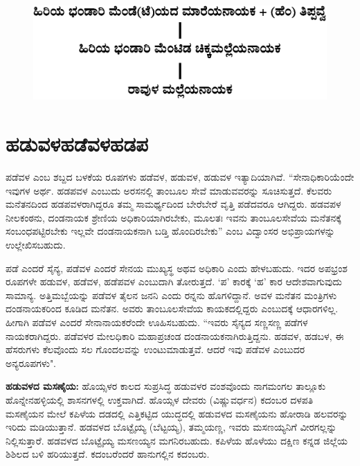 \begin{figure}[H]
\includegraphics[scale=1.2]{images/chap3/chap3fig31.jpeg}
\end{figure}


\section*{ಹಡುವಳ\enginline{-}ಹಡೆವಳ\enginline{-}ಹಡಪ}

ಪಡೆವಳ ಎಂಬ ಶಬ್ದದ ಬಳಕೆಯ ರೂಪಗಳು ಹಡೆವಳ, ಹಡುವಳ, ಹಡುವಳ ಇತ್ಯಾದಿಯಾಗಿವೆ. “ಸೇನಾಧಿಕಾರಿಯೆಂದೇ ಇವುಗಳ ಅರ್ಥ. ಹಡಪವಳ ಎಂಬುದು ಅರಸನಲ್ಲಿ ತಾಂಬೂಲ ಸೇವೆ ಮಾಡುವವರನ್ನು ಸೂಚಿಸುತ್ತದೆ. ಕೆಲವರು ಮನೆತನದಿಂದ ಹಡಪವಳರಾಗಿದ್ದರೂ ತಮ್ಮ ಸಾಮರ್ಥ್ಯದಿಂದ ಬೇರೆಬೇರೆ ವೃತ್ತಿ ಪಡೆದವರೂ ಆಗಿದ್ದರು. ಹಡವಪಳ ನೀಲಕಂಠನು, ದಂಡನಾಯಕ ಶ್ರೇಣಿಯ ಅಧಿಕಾರಿಯಾಗಿರಬೇಕು, ಮೂಲತಃ ಇವನು ತಾಂಬೂಲಸೇವೆಯ ಮನೆತನಕ್ಕೆ ಸಂಬಂಧಪಟ್ಟಿರಬೇಕು ಇಲ್ಲವೇ ದಂಡನಾಯಕನಾಗಿ ಬಡ್ತಿ ಹೊಂದಿರಬೇಕು” ಎಂಬ ವಿದ್ವಾಂಸರ ಅಭಿಪ್ರಾಯಗಳನ್ನು ಉಲ್ಲೇಖಿಸಬಹುದು.

ಪಡೆ ಎಂದರೆ ಸೈನ್ಯ, ಪಡೆವಳ ಎಂದರೆ ಸೇನಯ ಮುಖ್ಯಸ್ಥ ಅಥವ ಅಧಿಕಾರಿ ಎಂದು ಹೇಳಬಹುದು. ಇದರ ಅಪಭ್ರಂಶ ರೂಪಗಳೇ ಹಡುವಳ, ಹಡೆವಳ, ಹಡೆಪವಳ ಎಂಬುದಾಗಿ ತೋರುತ್ತದೆ. ‘ಪ’ ಕಾರಕ್ಕೆ ‘ಹ’ ಕಾರ ಆದೇಶವಾಗುವುದು ಸಾಮಾನ್ಯ. ಅತ್ತಿಮಬ್ಬೆಯನ್ನು ಪಡೆವಳ ತೈಲನ ಜನನಿ ಎಂದು ರನ್ನನು ಹೊಗಳಿದ್ದಾನೆ. ಅವಳ ಮನೆತನ ಮಂತ್ರಿಗಳು ದಂಡನಾಯಕರಿಂದ ಕೂಡಿದ ಮನೆತನ. ಅವರು ತಾಂಬೂಲಸೇವೆಯ ಕಾಯಕದಲ್ಲಿದ್ದರು ಎಂಬುದಕ್ಕೆ ಆಧಾರಗಳಿಲ್ಲ. ಹೀಗಾಗಿ ಪಡೆವಳ ಎಂದರೆ ಸೇನಾನಾಯಕರೆಂದೇ ಊಹಿಸಬಹುದು. “ಇವರು ಸೈನ್ಯದ ಸಣ್ಣಸಣ್ಣ ಪಡೆಗಳ ನಾಯಕರಾಗಿದ್ದರು. ಪಡೆವಳರ ಮೇಲಧಿಕಾರಿ ಮಹಾಪ್ರಚಂಡ ದಂಡನಾಯಕನಾಗಿರುತ್ತಿದ್ದನು. ಹಡವಳ, ಹಡಬಳ, ಈ ಹೆಸರುಗಳು ಕೆಲವೊಂದು ಸಲ ಗೊಂದಲವನ್ನು ಉಂಟುಮಾಡುತ್ತವೆ. ಆದರೆ ಇವು ಪಡೆವಳ ಎಂಬುದರ ಅನ್ಯರೂಪಗಳು".

\textbf{ಹಡುವಳದ ಮಸಣೈಯ:} ಹೊಯ್ಸಳರ ಕಾಲದ ಸುಪ್ರಸಿದ್ಧ ಹಡುವಳರ ವಂಶವೊಂದು ನಾಗಮಂಗಲ ತಾಲ್ಲೂಕು ಹೊನ್ನೇನಹಳ್ಳಿಯಲ್ಲಿ ಶಾಸನಗಳಲ್ಲಿ ಉಕ್ತವಾಗಿದೆ. ಹೊಯ್ಸಳ ದೇವರು (ವಿಷ್ಣುವರ್ಧನ) ಕದಂಬರ ದಳಪತಿ ಮಸಣೈಯನ ಮೇಲೆ ಕಪಿಳೆಯ ದಡದಲ್ಲಿ ಎತ್ತಿಕಟ್ಟಿದ ಯುದ್ಧದಲ್ಲಿ ಹಡುವಳದ ಮಸಣೈಯನು ಹೋರಾಡಿ ಹಲವರನ್ನು ಇರಿದು ಮಡಿಯುತ್ತಾನೆ. ಹಡವಳದ ಬೊಟ್ಟೈಯ್ಯ (ಬೆಟ್ಟಯ್ಯ), ತಮ್ಮಯಣ್ಣ, ಇವರು ಮಸಣಯ್ಯನಿಗೆ ವೀರಗಲ್ಲನ್ನು ನಿಲ್ಲಿಸುತ್ತಾರೆ. ಹಡವಳದ ಬೊಟ್ಟೈಯ್ಯ ಮಸಣಯ್ಯನ ಮಗನಿರಬಹುದು. ಕಪಿಳೆಯ ಹೊಳೆಯು ದಕ್ಷಿಣ ಕನ್ನಡ ಜಿಲ್ಲೆಯ ಶಿಶಿಲದ ಬಳಿ ಹರಿಯುತ್ತದೆ. ಕದಂಬರೆಂದರೆ ಹಾನುಗಲ್ಲಿನ ಕದಂಬರು.

